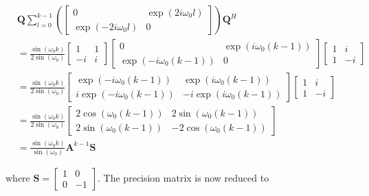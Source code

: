 \documentclass[11pt,a4paper,twoside]{report}
\newcommand{\mat}[1]{\mathbf{#1}}
\begin{document}
\begin{align}
	\nonumber
	& \mat{Q}\sum_{l=0}^{k-1}\left(
		\begin{bmatrix}
			0 & \exp{(2i\omega_0l)} \\
			\exp{(-2i\omega_0l)} & 0
		\end{bmatrix}
		\right)\mat{Q}^H
	\\
	\nonumber
	&= \frac{\sin{\left(\omega_0k\right)}}{2\sin{\left(\omega_0\right)}}
		\begin{bmatrix}
			1 & 1\\
			-i & i
		\end{bmatrix}
		\begin{bmatrix}
			0 & \exp{\left(i\omega_0\left(k-1\right)\right)} \\
			\exp{\left(-i\omega_0\left(k-1\right)\right)} & 0
		\end{bmatrix}
		\begin{bmatrix}
			1 & i \\
			1 & -i
		\end{bmatrix}
	\\
	\nonumber
	&= \frac{\sin{\left(\omega_0k\right)}}{2\sin{\left(\omega_0\right)}}
		\begin{bmatrix}
			\exp{\left(-i\omega_0\left(k-1\right)\right)} & \exp{\left(i\omega_0\left(k-1\right)\right)} \\
			i\exp{\left(-i\omega_0\left(k-1\right)\right)} & -i\exp{\left(i\omega_0\left(k-1\right)\right)}
		\end{bmatrix}
		\begin{bmatrix}
			1 & i \\
			1 & -i
		\end{bmatrix}
	\\
	\nonumber
	&= \frac{\sin{\left(\omega_0k\right)}}{2\sin{\left(\omega_0\right)}}
		\begin{bmatrix}
			2\cos{\left(\omega_0\left(k-1\right)\right)} & 2\sin{\left(\omega_0\left(k-1\right)\right)} \\
			2\sin{\left(\omega_0\left(k-1\right)\right)} & -2\cos{\left(\omega_0\left(k-1\right)\right)}
		\end{bmatrix}
	\\
	&= \frac{\sin{\left(\omega_0k\right)}}{\sin{\left(\omega_0\right)}}\mat{A}^{k-1}\mat{S}
\end{align}

where $\mat{S} = \begin{bmatrix} 1 & 0 \\
0 & -1 \end{bmatrix}$. The precision matrix is now reduced to
\end{document}
